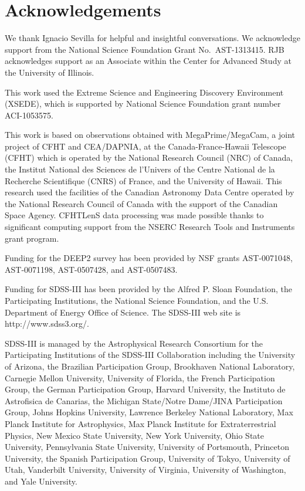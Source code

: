 \documentclass[useAMS,usenatbib]{mn2e}
\begin{document}
\section*{Acknowledgements}

We thank Ignacio Sevilla for helpful and insightful conversations.
We acknowledge support from the 
National Science Foundation Grant No.\ AST-1313415.
RJB acknowledges support as an Associate
within the Center for Advanced Study at the University of Illinois.


This work used the Extreme Science and Engineering Discovery Environment
(XSEDE), which is supported by National Science Foundation grant number
ACI-1053575.

This work is based on observations obtained with MegaPrime/MegaCam, a
joint project of CFHT and CEA/DAPNIA, at the Canada-France-Hawaii
Telescope (CFHT) which is operated by the National Research Council
(NRC) of Canada, the Institut National des Sciences de l'Univers of
the Centre National de la Recherche Scientifique (CNRS) of France, and
the University of Hawaii. This research used the facilities of the
Canadian Astronomy Data Centre operated by the National Research
Council of Canada with the support of the Canadian Space Agency.
CFHTLenS data processing was made possible thanks to significant
computing support from the NSERC Research Tools and Instruments grant
program.

Funding for the DEEP2 survey has been provided by NSF grants AST-0071048,
AST-0071198, AST-0507428, and AST-0507483. 

Funding for SDSS-III has been provided by the Alfred P. Sloan Foundation, the
Participating Institutions, the National Science Foundation, and the U.S.
Department of Energy Office of Science. The SDSS-III web site is
http://www.sdss3.org/.

SDSS-III is managed by the Astrophysical Research Consortium for the
Participating Institutions of the SDSS-III Collaboration including the
University of Arizona, the Brazilian Participation Group, Brookhaven National
Laboratory, Carnegie Mellon University, University of Florida, the French
Participation Group, the German Participation Group, Harvard University, the
Instituto de Astrofisica de Canarias, the Michigan State/Notre Dame/JINA
Participation Group, Johns Hopkins University, Lawrence Berkeley National
Laboratory, Max Planck Institute for Astrophysics, Max Planck Institute for
Extraterrestrial Physics, New Mexico State University, New York University,
Ohio State University, Pennsylvania State University, University of Portsmouth,
Princeton University, the Spanish Participation Group, University of Tokyo,
University of Utah, Vanderbilt University, University of Virginia, University
of Washington, and Yale University.
\end{document}

